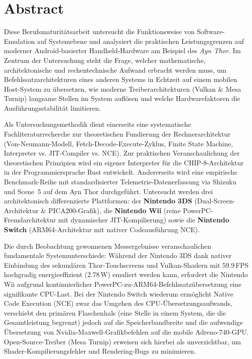 \documentclass[12pt,a4paper]{scrartcl}
\begin{document}
\thispagestyle{empty}
\null
\newpage

\onehalfspacing

\section*{Abstract}
\label{sec:abstract}

Diese Berufsmaturitätsarbeit untersucht die Funktionsweise von Software-Emulation auf Systemebene und analysiert die praktischen Leistungsgrenzen auf moderner Android-basierter Handheld-Hardware am Beispiel des \textit{Ayn Thor}. Im Zentrum der Untersuchung steht die Frage, welcher mathematische, architektonische und rechentechnische Aufwand erbracht werden muss, um Befehlssatzarchitekturen eines anderen Systems in Echtzeit auf einem mobilen Host-System zu übersetzen, wie moderne Treiberarchitekturen (Vulkan \& Mesa Turnip) langsame Stellen im System auflösen und welche Hardwarefaktoren die Ausführungsstabilität limitieren.

Als Untersuchungsmethodik dient einerseits eine systematische Fachliteraturrecherche zur theoretischen Fundierung der Rechnerarchitektur (Von-Neumann-Modell, Fetch-Decode-Execute-Zyklus, Finite State Machine, Interpreter vs. JIT-Compiler vs. NCE). Zur praktischen Veranschaulichung der theoretischen Prinzipien wird ein eigener Interpreter für die CHIP-8-Architektur in der Programmiersprache Rust entwickelt. Andererseits wird eine empirische Benchmark-Reihe mit standardisierter Telemetrie-Datenerfassung via Shizuku und Scene~5 auf dem Ayn Thor durchgeführt. Untersucht werden drei architektonisch differenzierte Plattformen: der \textbf{Nintendo 3DS} (Dual-Screen-Architektur \& PICA200-Grafik), die \textbf{Nintendo Wii} (reine PowerPC-Fremdarchitektur mit dynamischer JIT-Kompilierung) sowie die \textbf{Nintendo Switch} (ARM64-Architektur mit nativer Codeausführung NCE).

Die durch Beobachtung gewonnenen Messergebnisse veranschaulichen fundamentale Systemunterschiede: Während der Nintendo 3DS dank nativer Einbindung des sekundären Thor-Touchscreens und Vulkan-Shadern mit 59.9\,FPS hochgradig energieeffizient (2.78\,W) emuliert werden kann, erfordert die Nintendo Wii aufgrund kontinuierlicher PowerPC-zu-ARM64-Befehlssatzübersetzung eine signifikante CPU-Last. Bei der Nintendo Switch wiederum ermöglicht Native Code Execution (NCE) zwar das Umgehen des CPU-Übersetzungsaufwands, verschiebt den primären Flaschenhals (eine Stelle in einem System, die die Gesamtleistung begrenzt) jedoch auf die Speicherbandbreite und die aufwendige Übersetzung von Nvidia-Maxwell-Grafikbefehlen auf die mobile Adreno-740-GPU. Open-Source-Treiber (Mesa Turnip) erweisen sich hierbei als unverzichtbar, um Shader-Kompilierungsfehler und Rendering-Bugs zu minimieren.
\end{document}
